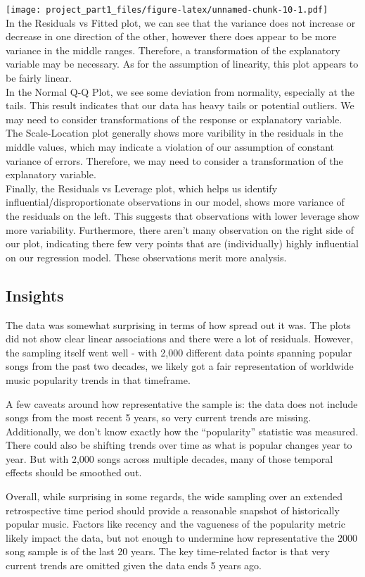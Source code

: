 \documentclass[
]{article}
\begin{document}
\texttt{[image: project\_part1\_files/figure-latex/unnamed-chunk-10-1.pdf]}\\
In the Residuals vs Fitted plot, we can see that the variance does not
increase or decrease in one direction of the other, however there does
appear to be more variance in the middle ranges. Therefore, a
transformation of the explanatory variable may be necessary. As for the
assumption of linearity, this plot appears to be fairly linear.\\
In the Normal Q-Q Plot, we see some deviation from normality, especially
at the tails. This result indicates that our data has heavy tails or
potential outliers. We may need to consider transformations of the
response or explanatory variable.\\
The Scale-Location plot generally shows more varibility in the residuals
in the middle values, which may indicate a violation of our assumption
of constant variance of errors. Therefore, we may need to consider a
transformation of the explanatory variable.\\
Finally, the Residuals vs Leverage plot, which helps us identify
influential/disproportionate observations in our model, shows more
variance of the residuals on the left. This suggests that observations
with lower leverage show more variability. Furthermore, there aren't
many observation on the right side of our plot, indicating there few
very points that are (individually) highly influential on our regression
model. These observations merit more analysis.\\

\hypertarget{insights}{%
\subsection{Insights}\label{insights}}

The data was somewhat surprising in terms of how spread out it was. The
plots did not show clear linear associations and there were a lot of
residuals. However, the sampling itself went well - with 2,000 different
data points spanning popular songs from the past two decades, we likely
got a fair representation of worldwide music popularity trends in that
timeframe.

A few caveats around how representative the sample is: the data does not
include songs from the most recent 5 years, so very current trends are
missing. Additionally, we don't know exactly how the ``popularity''
statistic was measured. There could also be shifting trends over time as
what is popular changes year to year. But with 2,000 songs across
multiple decades, many of those temporal effects should be smoothed out.

Overall, while surprising in some regards, the wide sampling over an
extended retrospective time period should provide a reasonable snapshot
of historically popular music. Factors like recency and the vagueness of
the popularity metric likely impact the data, but not enough to
undermine how representative the 2000 song sample is of the last 20
years. The key time-related factor is that very current trends are
omitted given the data ends 5 years ago.
\end{document}
